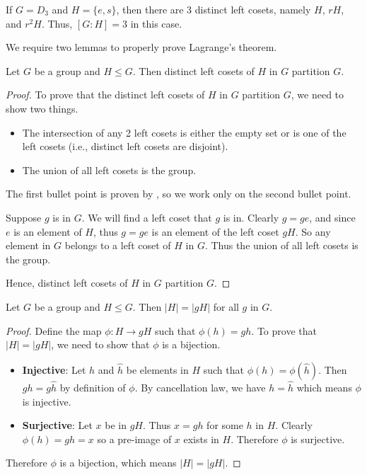 \begin{example}
    If $G = D_3$ and $H = \{e, s\}$, then there are 3 distinct left cosets, namely $H$, $rH$, and $r^2H$. Thus, $[G:H] = 3$ in this case.
\end{example}

We require two lemmas to properly prove Lagrange's theorem.
\begin{lemma}\label{lemma-left-coset-partition}
    Let $G$ be a group and $H \leq G$. Then distinct left cosets of $H$ in $G$ partition $G$.
\end{lemma}
\begin{proof}
    To prove that the distinct left cosets of $H$ in $G$ partition $G$, we need to show two things.
    \begin{itemize}
        \item The intersection of any 2 left cosets is either the empty set or is one of the left cosets (i.e., distinct left cosets are disjoint).
        \item The union of all left cosets is the group.
    \end{itemize}
    The first bullet point is proven by , so we work only on the second bullet point.

    Suppose $g$ is in $G$. We will find a left coset that $g$ is in. Clearly $g = ge$, and since $e$ is an element of $H$, thus $g = ge$ is an element of the left coset $gH$. So any element in $G$ belongs to a left coset of $H$ in $G$. Thus the union of all left cosets is the group.

    Hence, distinct left cosets of $H$ in $G$ partition $G$.
\end{proof}

\begin{lemma}\label{lemma-order-of-coset}
    Let $G$ be a group and $H \leq G$. Then $|H| = |gH|$ for all $g$ in $G$.
\end{lemma}
\begin{proof}
    Define the map $\phi: H \to gH$ such that $\phi(h) = gh$. To prove that $|H| = |gH|$, we need to show that $\phi$ is a bijection.
    \begin{itemize}
        \item \textbf{Injective}: Let $h$ and $\hat{h}$ be elements in $H$ such that $\phi(h) = \phi(\hat{h})$. Then $gh = g\hat{h}$ by definition of $\phi$. By cancellation law, we have $h = \hat{h}$ which means $\phi$ is injective.
        \item \textbf{Surjective}: Let $x$ be in $gH$. Thus $x = gh$ for some $h$ in $H$. Clearly $\phi(h) = gh = x$ so a pre-image of $x$ exists in $H$. Therefore $\phi$ is surjective.
    \end{itemize}
    Therefore $\phi$ is a bijection, which means $|H| = |gH|$.
\end{proof}

